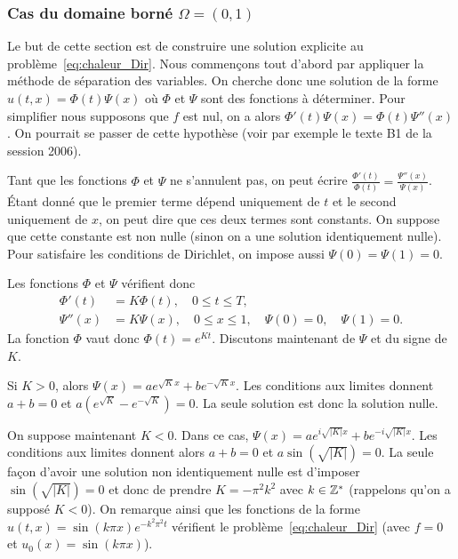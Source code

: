\documentclass[12pt,a4paper,twoside]{article}
\begin{document}
\subsubsection{Cas du domaine born\'e $\Omega = (0,1)$}

Le but de cette section est de construire une solution explicite
au probl\`eme~\eqref{eq:chaleur_Dir}.
Nous commen\c{c}ons tout d'abord par appliquer la m\'ethode de s\'eparation des variables.
On cherche donc une solution de la forme
$u(t,x) = \Phi(t) \Psi(x)$ o\`u $\Phi$ et $\Psi$ sont des fonctions \`a d\'eterminer.
Pour simplifier nous supposons que $f$ est nul, on a alors $\Phi'(t) \Psi(x) = \Phi(t) \Psi''(x)$.
On pourrait se passer de cette hypoth\`ese (voir par exemple le texte B1 de la session 2006).


Tant que les fonctions $\Phi$ et $\Psi$ ne s'annulent pas, on peut \'ecrire
$\frac{\Phi'(t)}{\Phi(t)} = \frac{\Psi''(x)}{\Psi(x)}$.
\'Etant donn\'e que le premier terme d\'epend uniquement de $t$
et le second uniquement de $x$, on peut dire que ces deux termes sont constants.
On suppose que cette constante est non nulle (sinon on a une solution
identiquement nulle).
Pour satisfaire les conditions de Dirichlet, on impose aussi $\Psi(0) = \Psi(1) = 0$.


Les fonctions $\Phi$ et $\Psi$ v\'erifient donc
\begin{align*}
  \Phi'(t)
  &= K \Phi(t) , \quad 0 \leq t \leq T,
  \\
  \Psi''(x)
  &= K \Psi(x) , \quad 0 \leq x \leq 1, \quad
  \Psi(0)
  = 0 , \quad
  \Psi(1)
  = 0 .
\end{align*}
La fonction $\Phi$ vaut donc $\Phi(t) = e^{K t}$. Discutons maintenant de $\Psi$ et du signe de $K$.

Si $K>0$, alors $\Psi(x) = a e^{\sqrt{K} x} + b e^{- \sqrt{K} x}$.
Les conditions aux limites donnent
$a+b=0$ et $a(e^{\sqrt{K}} - e^{-\sqrt{K}}) = 0$.
La seule solution est donc la solution nulle.


On suppose maintenant $K < 0$.
Dans ce cas, $\Psi(x) = a e^{i\sqrt{|K|} x} + b e^{- i\sqrt{|K|} x}$.
Les conditions aux limites donnent alors $a + b = 0$
et $a \sin(\sqrt{|K|}) = 0$.
La seule fa\c{c}on d'avoir une solution non identiquement nulle
est d'imposer $\sin(\sqrt{|K|}) = 0$ et donc de prendre $K = - \pi^2 k^2$ avec $k \in \mathbb{Z}^*$
(rappelons qu'on a suppos\'e $K<0$).
On remarque ainsi
que les fonctions de la forme $u(t,x) = \sin(k \pi x) e^{-k^2 \pi^2 t}$
v\'erifient le probl\`eme~\eqref{eq:chaleur_Dir} (avec $f = 0$ et $u_0(x) = \sin(k \pi x)$).
\end{document}
